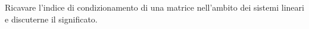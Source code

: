 Ricavare l'indice di condizionamento di una matrice nell'ambito 
dei sistemi lineari e discuterne il significato.
